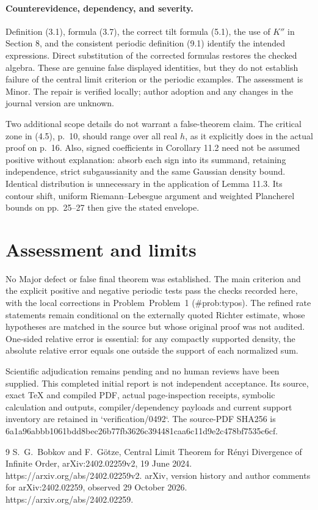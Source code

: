 \documentclass[10pt]{article}
\begin{document}
\paragraph*{Counterevidence, dependency, and severity.}\mbox{}\par
Definition (3.1), formula (3.7), the correct tilt formula (5.1), the use of \(K''\) in Section 8, and the consistent periodic definition (9.1) identify the intended expressions. Direct substitution of the corrected formulas restores the checked algebra. These are genuine false displayed identities, but they do not establish failure of the central limit criterion or the periodic examples. The assessment is Minor. The repair is verified locally; author adoption and any changes in the journal version are unknown.\par
Two additional scope details do not warrant a false-theorem claim. The critical zone in (4.5), p. 10, should range over all real \(h\), as it explicitly does in the actual proof on p. 16. Also, signed coefficients in Corollary 11.2 need not be assumed positive without explanation: absorb each sign into its summand, retaining independence, strict subgaussianity and the same Gaussian density bound. Identical distribution is unnecessary in the application of Lemma 11.3. Its contour shift, uniform Riemann–Lebesgue argument and weighted Plancherel bounds on pp. 25–27 then give the stated envelope.\par
\section*{Assessment and limits}
No Major defect or false final theorem was established. The main criterion and the explicit positive and negative periodic tests pass the checks recorded here, with the local corrections in Problem Problem 1 (\#prob:typos). The refined rate statements remain conditional on the externally quoted Richter estimate, whose hypotheses are matched in the source but whose original proof was not audited. One-sided relative error is essential: for any compactly supported density, the absolute relative error equals one outside the support of each normalized sum.\par
Scientific adjudication remains pending and no human reviews have been supplied. This completed initial report is not independent acceptance. Its source, exact TeX and compiled PDF, actual page-inspection receipts, symbolic calculation and outputs, compiler/dependency payloads and current support inventory are retained in `verification/0492`. The source-PDF SHA256 is 6a1a96abbb1061bdd8bec26b77fb3626c394481caa6c11d9e2c478bf7535c6cf.\par
9 S. G. Bobkov and F. Götze, Central Limit Theorem for Rényi Divergence of Infinite Order, arXiv:2402.02259v2, 19 June 2024. https://arxiv.org/abs/2402.02259v2. arXiv, version history and author comments for arXiv:2402.02259, observed 29 October 2026. https://arxiv.org/abs/2402.02259.\par
\end{document}
